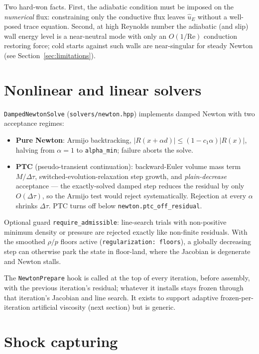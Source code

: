 \documentclass[11pt]{article}
\newcommand{\code}[1]{\texttt{#1}}
\newcommand{\uhat}{\hat{u}}
\begin{document}
Two hard-won facts. First, the adiabatic condition must be imposed on
the \emph{numerical} flux: constraining only the conductive flux leaves
$\uhat_E$ without a well-posed trace equation. Second, at high Reynolds
number the adiabatic (and slip) wall energy level is a near-neutral
mode with only an $O(1/\mathrm{Re})$ conduction restoring force; cold
starts against such walls are near-singular for steady Newton (see
Section~\ref{sec:limitations}).

\section{Nonlinear and linear solvers}

\code{DampedNewtonSolve} (\code{solvers/newton.hpp}) implements damped
Newton with two acceptance regimes:
\begin{itemize}
  \item \textbf{Pure Newton}: Armijo backtracking,
        $|R(x+\alpha d)| \le (1 - c_1 \alpha)|R(x)|$, halving from
        $\alpha = 1$ to \code{alpha\_min}; failure aborts the solve.
  \item \textbf{PTC} (pseudo-transient continuation): backward-Euler
        volume mass term $M/\Delta\tau$, switched-evolution-relaxation
        step growth, and \emph{plain-decrease} acceptance --- the
        exactly-solved damped step reduces the residual by only
        $O(\Delta\tau)$, so the Armijo test would reject
        systematically. Rejection at every $\alpha$ shrinks
        $\Delta\tau$. PTC turns off below
        \code{newton.ptc\_off\_residual}.
\end{itemize}
Optional guard \code{require\_admissible}: line-search trials with
non-positive minimum density or pressure are rejected exactly like
non-finite residuals. With the smoothed $\rho/p$ floors active
(\code{regularization: floors}), a globally decreasing step can
otherwise park the state in floor-land, where the Jacobian is
degenerate and Newton stalls.

The \code{NewtonPrepare} hook is called at the top of every iteration,
before assembly, with the previous iteration's residual; whatever it
installs stays frozen through that iteration's Jacobian and line
search. It exists to support adaptive frozen-per-iteration artificial
viscosity (next section) but is generic.

\section{Shock capturing}
\label{sec:av}
\end{document}

